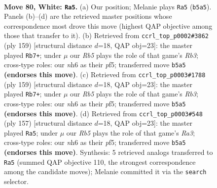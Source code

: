 \documentclass[11pt]{article}
\begin{document}
\clearpage

\begin{figure}[p]\centering
\begin{subfigure}{0.46\textwidth}\centering
\resizebox{\linewidth}{!}{%
\newchessgame
\chessboard[
  setfen={8/3k4/7n/1R6/p6r/P6p/7K/8 w - - 18 80},
  showmover=false,
  pgfstyle=straightmove, color=movearrow, markmove={b5-a5}
]}
\caption{}
\end{subfigure}\hfill
\begin{subfigure}{0.46\textwidth}\centering
\resizebox{\linewidth}{!}{%
\newchessgame
\chessboard[
  setfen={8/4K2k/1r5P/5P1R/8/8/8/8 b - - 22 80},
  showmover=false,
  pgfstyle=straightmove, color=movearrow, markmove={b6-b7}
]}
\caption{}
\end{subfigure}
\\[4pt]
\begin{subfigure}{0.46\textwidth}\centering
\resizebox{\linewidth}{!}{%
\newchessgame
\chessboard[
  setfen={8/4K2k/1r5P/5P1R/8/8/8/8 b - - 42 80},
  showmover=false,
  pgfstyle=straightmove, color=movearrow, markmove={b6-b7}
]}
\caption{}
\end{subfigure}\hfill
\begin{subfigure}{0.46\textwidth}\centering
\resizebox{\linewidth}{!}{%
\newchessgame
\chessboard[
  setfen={8/4K2k/r6P/5P1R/8/8/8/8 b - - 16 79},
  showmover=false,
  pgfstyle=straightmove, color=movearrow, markmove={a6-a5}
]}
\caption{}
\end{subfigure}
\caption{\textbf{Move 80, White: \texttt{Ra5}.} (a) Our position; Melanie plays \texttt{Ra5} (\texttt{b5a5}). Panels (b)--(d) are the retrieved master positions whose correspondence most drove this move (highest QAP objective among those that transfer to it). (b) Retrieved from \texttt{ccrl\_top\_p0002\#3862} (ply 159) [structural distance $d$=18, QAP obj=23]: the master played \texttt{Rb7+}; under $\mu$ our \emph{Rb5} plays the role of that game's \emph{Rb3}; cross-type roles: our \emph{n}h6 as their \emph{p}f5; transferred move \texttt{b5a5} \textbf{(endorses this move)}. (c) Retrieved from \texttt{ccrl\_top\_p0003\#1788} (ply 159) [structural distance $d$=18, QAP obj=23]: the master played \texttt{Rb7+}; under $\mu$ our \emph{Rb5} plays the role of that game's \emph{Rb3}; cross-type roles: our \emph{n}h6 as their \emph{p}f5; transferred move \texttt{b5a5} \textbf{(endorses this move)}. (d) Retrieved from \texttt{ccrl\_top\_p0003\#548} (ply 157) [structural distance $d$=18, QAP obj=23]: the master played \texttt{Ra5}; under $\mu$ our \emph{Rb5} plays the role of that game's \emph{Ra3}; cross-type roles: our \emph{n}h6 as their \emph{p}f5; transferred move \texttt{b5a5} \textbf{(endorses this move)}. Synthesis: 5 retrieved analogs transferred to \texttt{Ra5} (summed QAP objective 110, the strongest correspondence among the candidate moves); Melanie committed it via the \texttt{search} selector.}
\label{fig:thought-m158}
\end{figure}
\end{document}
